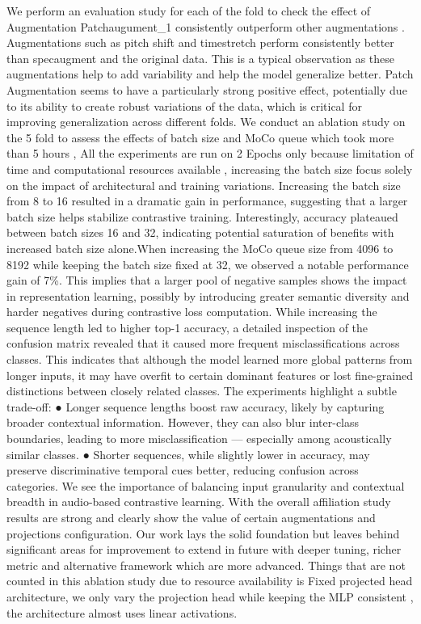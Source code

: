 \documentclass[11pt]{article}
\begin{document}
We  perform an evaluation study for each of the fold to check the effect of Augmentation Patchaugument\_1 consistently outperform other augmentations . Augmentations such as pitch shift and timestretch perform consistently better than specaugment and the original data. This is a typical observation as these augmentations help to add variability and help the model generalize better.
Patch Augmentation seems to have a particularly strong positive effect, potentially due to its ability to create robust variations of the data, which is critical for improving generalization across different folds.
We conduct an ablation study on the 5 fold to assess the effects of batch size and MoCo queue which took more than 5 hours , All the experiments are run on 2 Epochs only because limitation of time and computational resources available , increasing the batch size focus solely on the impact of architectural and training variations.
Increasing the batch size from 8 to 16 resulted in a dramatic gain in performance, suggesting that a larger batch size helps stabilize contrastive training. Interestingly, accuracy plateaued between batch sizes 16 and 32, indicating potential saturation of benefits with increased batch size alone.When increasing the MoCo queue size from 4096 to 8192 while keeping the batch size fixed at 32, we observed a notable performance gain of 7\%. This implies that a larger pool of negative samples shows the impact in representation learning, possibly by introducing greater semantic diversity and harder negatives during contrastive loss computation. While increasing the sequence length led to higher top-1 accuracy, a detailed inspection of the confusion matrix revealed that it caused more frequent misclassifications across classes. This indicates that although the model learned more global patterns from longer inputs, it may have overfit to certain dominant features or lost fine-grained distinctions between closely related classes.
The experiments highlight a subtle trade-off:
●	Longer sequence lengths boost raw accuracy, likely by capturing broader contextual information. However, they can also blur inter-class boundaries, leading to more misclassification — especially among acoustically similar classes.
●	Shorter sequences, while slightly lower in accuracy, may preserve discriminative temporal cues better, reducing confusion across categories.
We see the importance of balancing input granularity and contextual breadth in audio-based contrastive learning.
With the overall affiliation study results are strong and clearly show the value of certain augmentations and projections configuration. Our work lays the solid foundation but leaves behind significant areas for improvement to extend in future with deeper tuning, richer metric and alternative framework which are more advanced. Things that are not counted in this ablation study due to resource availability is Fixed projected head architecture, we only vary the projection head while keeping the MLP consistent , the architecture almost uses linear activations.
\end{document}
